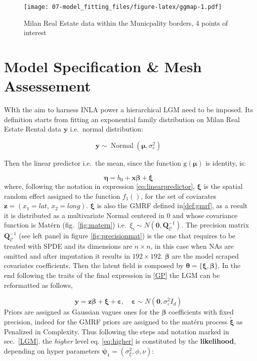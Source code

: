 \documentclass[
  12pt,
  a4paper,
  oneside]{book}
\theoremstyle{definition}
\theoremstyle{definition}
\theoremstyle{definition}
\theoremstyle{remark}
\begin{document}
\begin{figure}
\centering
\texttt{[image: 07-model\_fitting\_files/figure-latex/ggmap-1.pdf]}
\caption{\label{fig:ggmap}Milan Real Estate data within the Municpality borders, 4 points of interest}
\end{figure}

\hypertarget{modelspecandmesh}{%
\section{Model Specification \& Mesh Assessement}\label{modelspecandmesh}}

WIth the aim to harness INLA power a hierarchical LGM need to be imposed. Its definition starts from fitting an exponential family distribution on Milan Real Estate Rental data \(\mathbf{y}\) i.e.~normal distribution:

\[
\mathbf{y}\sim \operatorname{Normal}\left(\boldsymbol\mu, \sigma_{e}^{2}\right)
\]

Then the linear predictor i.e.~the mean, since the function \(\mathrm{g}\left(\boldsymbol\mu\right)\) is identity, is:

\[
\boldsymbol\eta=b_{0}+\boldsymbol x \boldsymbol\beta+\boldsymbol\xi 
\]
where, following the notation in expression \eqref{eq:linearpredictor}, \(\boldsymbol\xi\) is the spatial random effect assigned to the function \(f_1()\), for the set of coviarates \(\boldsymbol{z}=\left(x_{1} = lat,\, x_{2} = long\right)\). \(\boldsymbol\xi\) is also the GMRF defined in\ref{def:gmrf}, as a result it is distributed as a multivariate Normal centered in 0 and whose covariance function is Matérn (fig.~\ref{fig:matern}) i.e.~\(\xi_{i} \sim N\left(\mathbf{0}, \mathbf{Q}_{\mathscr{C}}^{-1}\right)\). The precision matrix \(\mathbf{Q}_{\mathscr{C}}^{-1}\) (see left panel in figure \ref{fig:precisionmat}) is the one that requires to be treated with SPDE and its dimensions are \(n \times n\), in this case when NAs are omitted and after imputation it results in \(192 \times 192\).
\(\boldsymbol\beta\) are the model scraped covariates coefficients.
Then the latent field is composed by \(\boldsymbol{\theta}=\{\boldsymbol{\xi}, \boldsymbol{\beta}\}\). In the end following the traits of the final expression in \ref{GP} the LGM can be reformatted as follows,

\[
\boldsymbol{\mathbf{y}}=\boldsymbol{z} \boldsymbol{\beta}+\boldsymbol{\xi}+\boldsymbol{\varepsilon}, \quad \boldsymbol{\varepsilon} \sim N\left(\mathbf{0},  \sigma^2_{\varepsilon} I_{d}\right)
\]
Priors are assigned as Gaussian vagues ones for the \(\boldsymbol\beta\) coefficients with fixed precision, indeed for the GMRF priors are assigned to the matérn process \(\tilde{\boldsymbol\xi}\) as Penalized in Complexity.
Thus following the steps and notation marked in sec.~\ref{LGM}. the \emph{higher} level eq. \eqref{eq:higher} is constituted by the \textbf{likelihood}, depending on hyper parameters \(\boldsymbol\psi_1 = \left(\sigma_{\mathscr{\xi}}^{2}, \phi, \nu\right)\):
\end{document}
